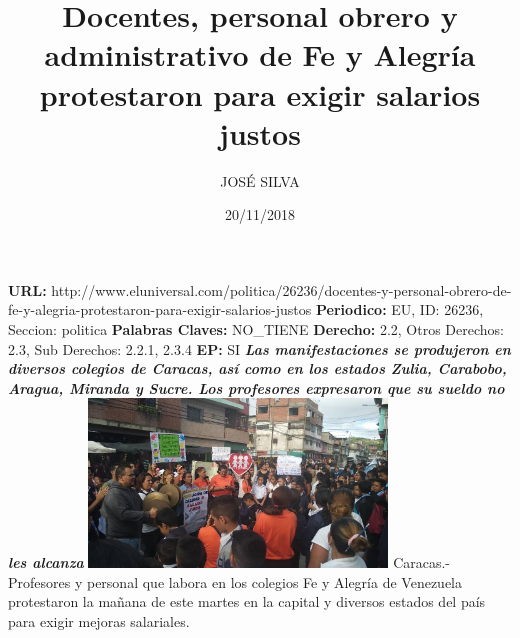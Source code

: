 \documentclass{article}%
\title{\textbf{Docentes, personal obrero y administrativo de Fe y Alegría protestaron para exigir salarios justos}}%
\author{JOSÉ SILVA}%
\date{20/11/2018}%
\begin{document}
%
\normalsize%
\maketitle%
\textbf{URL: }%
http://www.eluniversal.com/politica/26236/docentes{-}y{-}personal{-}obrero{-}de{-}fe{-}y{-}alegria{-}protestaron{-}para{-}exigir{-}salarios{-}justos\newline%
%
\textbf{Periodico: }%
EU, %
ID: %
26236, %
Seccion: %
politica\newline%
%
\textbf{Palabras Claves: }%
NO\_TIENE\newline%
%
\textbf{Derecho: }%
2.2, %
Otros Derechos: %
2.3, %
Sub Derechos: %
2.2.1, 2.3.4\newline%
%
\textbf{EP: }%
SI\newline%
\newline%
%
\textbf{\textit{Las manifestaciones se produjeron en diversos colegios de Caracas, así como en los estados Zulia, Carabobo, Aragua, Miranda y Sucre. Los profesores expresaron que su sueldo no les alcanza}}%
\newline%
\newline%
%
\includegraphics[width=300px]{110.jpg}%
\newline%
%
Caracas.{-} Profesores y personal que labora en los colegios Fe y Alegría de Venezuela protestaron la mañana de este martes en la capital y diversos estados del país para exigir mejoras salariales.%
\newline%
%
\end{document}
